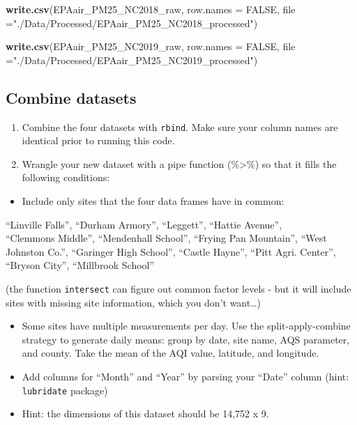 \documentclass[
]{article}
\newenvironment{Shaded}{\begin{snugshade}}{\end{snugshade}}
\newcommand{\AttributeTok}[1]{\textcolor[rgb]{0.13,0.29,0.53}{#1}}
\newcommand{\ConstantTok}[1]{\textcolor[rgb]{0.56,0.35,0.01}{#1}}
\newcommand{\FunctionTok}[1]{\textcolor[rgb]{0.13,0.29,0.53}{\textbf{#1}}}
\newcommand{\NormalTok}[1]{#1}
\newcommand{\StringTok}[1]{\textcolor[rgb]{0.31,0.60,0.02}{#1}}
\providecommand{\tightlist}{%
  \setlength{\itemsep}{0pt}\setlength{\parskip}{0pt}}
\begin{document}
\begin{Shaded}
\begin{Highlighting}[]
\FunctionTok{write.csv}\NormalTok{(EPAair\_PM25\_NC2018\_raw, }\AttributeTok{row.names =} \ConstantTok{FALSE}\NormalTok{, }
          \AttributeTok{file =}\StringTok{"./Data/Processed/EPAair\_PM25\_NC2018\_processed"}\NormalTok{)}

\FunctionTok{write.csv}\NormalTok{(EPAair\_PM25\_NC2019\_raw, }\AttributeTok{row.names =} \ConstantTok{FALSE}\NormalTok{, }
          \AttributeTok{file =}\StringTok{"./Data/Processed/EPAair\_PM25\_NC2019\_processed"}\NormalTok{)}
\end{Highlighting}
\end{Shaded}

\subsection{Combine datasets}\label{combine-datasets}

\begin{enumerate}
\def\labelenumi{\arabic{enumi}.}
\setcounter{enumi}{6}
\item
  Combine the four datasets with \texttt{rbind}. Make sure your column
  names are identical prior to running this code.
\item
  Wrangle your new dataset with a pipe function (\%\textgreater\%) so
  that it fills the following conditions:
\end{enumerate}

\begin{itemize}
\tightlist
\item
  Include only sites that the four data frames have in common:
\end{itemize}

``Linville Falls'', ``Durham Armory'', ``Leggett'', ``Hattie Avenue'',\\
``Clemmons Middle'', ``Mendenhall School'', ``Frying Pan Mountain'',
``West Johnston Co.'', ``Garinger High School'', ``Castle Hayne'',
``Pitt Agri. Center'', ``Bryson City'', ``Millbrook School''

(the function \texttt{intersect} can figure out common factor levels -
but it will include sites with missing site information, which you don't
want\ldots)

\begin{itemize}
\item
  Some sites have multiple measurements per day. Use the
  split-apply-combine strategy to generate daily means: group by date,
  site name, AQS parameter, and county. Take the mean of the AQI value,
  latitude, and longitude.
\item
  Add columns for ``Month'' and ``Year'' by parsing your ``Date'' column
  (hint: \texttt{lubridate} package)
\item
  Hint: the dimensions of this dataset should be 14,752 x 9.
\end{itemize}
\end{document}
